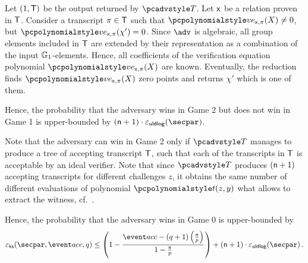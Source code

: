   Let $(1, \mathsf{T})$ be the output returned by $\tdv$. Let $\mathsf{x}$ be a relation proven in $\mathsf{T}$.  Consider a transcript $\pi \in \mathsf{T}$ such that $\vereq_{\inp, \zkproof}(X) \neq 0$, but $\vereq_{\inp, \zkproof}(\chi') = 0$. Since $\adv$ is algebraic, all group elements included in $\mathsf{T}$ are extended by their representation as a combination of the input $\mathbb{G}_1$-elements. Hence, all coefficients of the verification equation polynomial $\vereq_{\inp, \zkproof}(X)$ are known. 
  Eventually, the reduction finds $\vereq_{\inp, \zkproof}(X)$ zero points and returns $\chi'$ which is one of them.
    
  Hence, the probability that the adversary wins in Game 2 but does not win in Game 1 is upper-bounded by $(\noofc + 1) \cdot \epsuldlog (\secpar)$.

  Note that the adversary can win in Game 2 only if $\tdv$ manages to produce a tree of accepting transcript $\mathsf{T}$, such that each of the transcripts in $\mathsf{T}$ is acceptable by an ideal verifier. Note that since $\tdv$ produces $(\mathsf{n} + 1)$ accepting transcripts for different challenges $z$, it obtains the same number of different evaluations of polynomial $\p{t} (z, y)$ what allows to extract the witness, cf.~\cite{CCS:MBKM19}.

  Hence, the probability that the adversary wins in Game 0 is upper-bounded by 
  \[
    \epscss(\secpar,\accProb, q) \leq \left(1 - \frac{\accProb - (q + 1) \left( \frac{\noofc}{p} \right)}{1 - \frac{\noofc}{p}}\right) + (\noofc + 1) \cdot\epsuldlog (\secpar)\,. 
  \]

